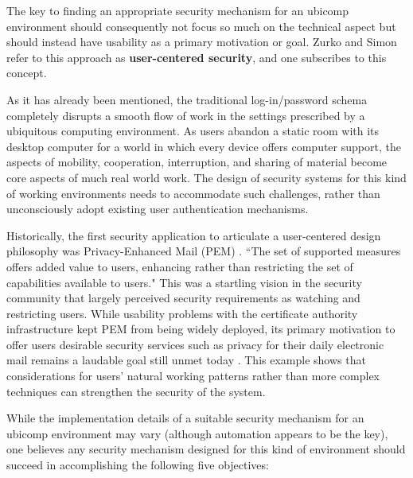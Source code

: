 \documentclass{article}
\begin{document}
The key to finding an appropriate security mechanism for an ubicomp environment should consequently not focus so much on the technical aspect but should instead have usability as a primary motivation or goal.  Zurko and Simon \cite{zurko1996user} refer to this approach as \textbf{user-centered security}, and one subscribes to this concept. 

As it has already been mentioned, the traditional log-in/password schema completely disrupts a smooth flow of work in the settings prescribed by a ubiquitous computing environment. As users abandon a static room with its desktop computer for a world in which every device offers computer support, the aspects of mobility, cooperation, interruption, and sharing of material become core aspects of much real world work. The design of security systems for this kind of working environments needs to accommodate such challenges, rather than unconsciously adopt existing user authentication mechanisms.

Historically, the first security application to articulate a user-centered design philosophy was Privacy-Enhanced Mail (PEM) \cite{linn1993privacy}. ``The set of supported measures offers added value to users, enhancing rather than restricting the set of capabilities available to users." This was a startling vision in the security community that largely perceived security requirements as watching and restricting users. While usability problems with the certificate authority infrastructure kept PEM from being widely deployed, its primary motivation to offer users desirable security services such as privacy for their daily electronic mail remains a laudable goal still  unmet today \cite{zurko1996user}.  This example shows that considerations for users' natural working patterns rather than more complex techniques can strengthen the security of the system.

While the implementation details of a suitable security mechanism for an ubicomp environment may vary (although automation appears to be the key), one believes any security mechanism designed for this kind of environment should succeed in accomplishing the following five objectives:
\end{document}
